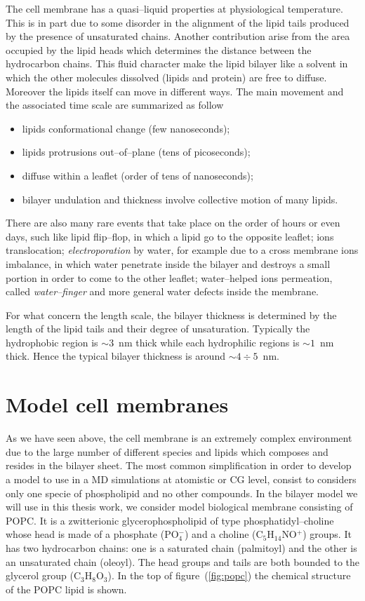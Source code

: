 The cell membrane has a quasi--liquid properties at physiological temperature. This is in part due to some disorder in the alignment of the lipid tails produced by the presence of unsaturated chains. Another contribution arise from the area occupied by the lipid heads which determines the distance between the hydrocarbon chains. This fluid character make the lipid bilayer like a solvent in which the other molecules dissolved (lipids and protein) are free to diffuse. Moreover the lipids itself can move in different ways. The main movement and the associated time scale are summarized as follow
\begin{itemize}
	\item lipids conformational change (few nanoseconds);
	\item lipids protrusions out--of--plane (tens of picoseconds);
	\item diffuse within a leaflet (order of tens of nanoseconds);
	\item bilayer undulation and thickness involve collective motion of many lipids.
\end{itemize}
There are also many rare events that take place on the order of hours or even days, such like lipid flip--flop, in which a lipid go to the opposite leaflet; ions translocation; \textit{electroporation} by water, for example due to a cross membrane ions imbalance, in which water penetrate inside the bilayer and destroys a small portion in order to come to the other leaflet; water--helped ions permeation, called \textit{water--finger} and more general water defects inside the membrane.

For what concern the length scale, the bilayer thickness is determined by the length of the lipid tails and their degree of unsaturation. Typically the hydrophobic region is $\sim 3$~nm thick while each hydrophilic regions is $\sim 1$~nm thick. Hence the typical bilayer thickness is around $\sim 4\div 5$~nm.

\section{Model cell membranes}
As we have seen above, the cell membrane is an extremely complex environment due to the large number of different species and lipids which composes and resides in the bilayer sheet. The most common simplification in order to develop a model to use in a \ac{MD} simulations at atomistic or \ac{CG} level, consist to considers only one specie of phospholipid and no other compounds. In the bilayer model we will use in this thesis work, we consider model biological membrane consisting of \ac{POPC}. It is a zwitterionic glycerophospholipid of type phosphatidyl--choline whose head is made of a phosphate (PO$_4^-$) and a choline (C$_5$H$_{14}$NO$^+$) groups. It has two hydrocarbon chains: one is a saturated chain (palmitoyl) and the other is an unsaturated chain (oleoyl). The head groups and tails are both bounded to the glycerol group (C$_3$H$_8$O$_3$). In the top of figure~(\ref{fig:popc}) the chemical structure of the \ac{POPC} lipid is shown.

